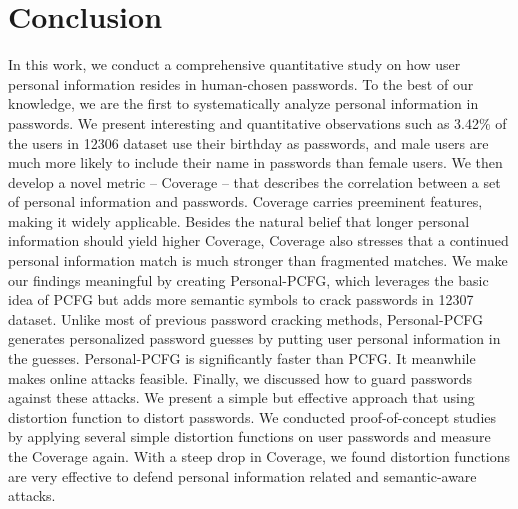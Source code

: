 \section{Conclusion}
In this work, we conduct a comprehensive quantitative study on how user personal information resides in human-chosen passwords. To the best of our knowledge, we are the first to systematically analyze personal information in passwords. We present interesting and quantitative observations such as 3.42\% of the users in 12306 dataset use their birthday as passwords, and male users are much more likely to include their name in passwords than female users. We then develop a novel metric -- Coverage -- that describes the correlation between a set of personal information and passwords. Coverage carries preeminent features, making it widely applicable. Besides the natural belief that longer personal information should yield higher Coverage, Coverage also stresses that a continued personal information match is much stronger than fragmented matches. We make our findings meaningful by creating Personal-PCFG, which leverages the basic idea of PCFG but adds more semantic symbols to crack passwords in 12307 dataset. Unlike most of previous password cracking methods, Personal-PCFG generates personalized password guesses by putting user personal information in the guesses. Personal-PCFG is significantly faster than PCFG. It meanwhile makes online attacks feasible. Finally, we discussed how to guard passwords against these attacks. We present a simple but effective approach that using distortion function to distort passwords. We conducted proof-of-concept studies by applying several simple distortion functions on user passwords and measure the Coverage again. With a steep drop in Coverage, we found distortion functions are very effective to defend personal information related and semantic-aware attacks.